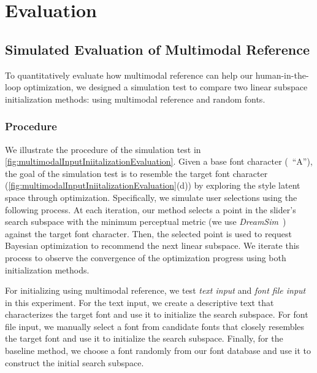 \section{Evaluation}
\label{evaluation}

\subsection{Simulated Evaluation of Multimodal Reference}
\label{sec:simulatedEvaluation}
To quantitatively evaluate how multimodal reference can help our human-in-the-loop optimization, we designed a simulation test to compare two linear subspace initialization methods: using multimodal reference and random fonts.
\subsubsection{Procedure}
We illustrate the procedure of the simulation test in \autoref{fig:multimodalInputIniitalizationEvaluation}. 
Given a base font character (\eg~``A''), the goal of the simulation test is to resemble the target font character (\autoref{fig:multimodalInputIniitalizationEvaluation}(d)) by exploring the style latent space through optimization.
Specifically, we simulate user selections using the following process. 
At each iteration, our method selects a point in the slider's search subspace with the minimum perceptual metric (we use \textit{DreamSim}~\cite{fu2023dreamsim}) against the target font character.
Then, the selected point is used to request Bayesian optimization to recommend the next linear subspace.
We iterate this process to observe the convergence of the optimization progress using both initialization methods.

For initializing using multimodal reference, we test \textit{text input} and \textit{font file input} in this experiment.
For the text input, we create a descriptive text that characterizes the target font and use it to initialize the search subspace.
For font file input, we manually select a font from candidate fonts that closely resembles the target font and use it to initialize the search subspace.
Finally, for the baseline method, we choose a font randomly from our font database and use it to construct the initial search subspace.

